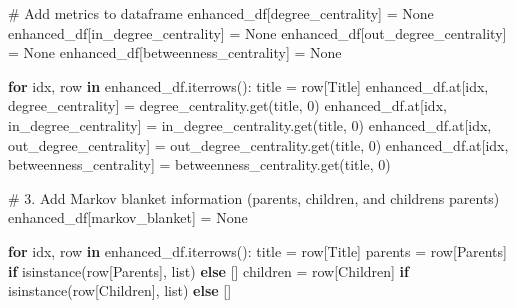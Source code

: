 \documentclass[
  11pt,
  letterpaper,
]{book}
\newenvironment{Shaded}{\begin{snugshade}}{\end{snugshade}}
\newcommand{\BuiltInTok}[1]{\textcolor[rgb]{0.00,0.23,0.31}{#1}}
\newcommand{\CommentTok}[1]{\textcolor[rgb]{0.37,0.37,0.37}{#1}}
\newcommand{\ControlFlowTok}[1]{\textcolor[rgb]{0.00,0.23,0.31}{\textbf{#1}}}
\newcommand{\DecValTok}[1]{\textcolor[rgb]{0.68,0.00,0.00}{#1}}
\newcommand{\KeywordTok}[1]{\textcolor[rgb]{0.00,0.23,0.31}{\textbf{#1}}}
\newcommand{\NormalTok}[1]{\textcolor[rgb]{0.00,0.23,0.31}{#1}}
\newcommand{\OperatorTok}[1]{\textcolor[rgb]{0.37,0.37,0.37}{#1}}
\newcommand{\StringTok}[1]{\textcolor[rgb]{0.13,0.47,0.30}{#1}}
\newcommand{\VariableTok}[1]{\textcolor[rgb]{0.07,0.07,0.07}{#1}}
\begin{document}
\begin{Shaded}
\begin{Highlighting}[]
    \CommentTok{\# Add metrics to dataframe}
\NormalTok{    enhanced\_df[}\StringTok{\textquotesingle{}degree\_centrality\textquotesingle{}}\NormalTok{] }\OperatorTok{=} \VariableTok{None}
\NormalTok{    enhanced\_df[}\StringTok{\textquotesingle{}in\_degree\_centrality\textquotesingle{}}\NormalTok{] }\OperatorTok{=} \VariableTok{None}
\NormalTok{    enhanced\_df[}\StringTok{\textquotesingle{}out\_degree\_centrality\textquotesingle{}}\NormalTok{] }\OperatorTok{=} \VariableTok{None}
\NormalTok{    enhanced\_df[}\StringTok{\textquotesingle{}betweenness\_centrality\textquotesingle{}}\NormalTok{] }\OperatorTok{=} \VariableTok{None}

    \ControlFlowTok{for}\NormalTok{ idx, row }\KeywordTok{in}\NormalTok{ enhanced\_df.iterrows():}
\NormalTok{        title }\OperatorTok{=}\NormalTok{ row[}\StringTok{\textquotesingle{}Title\textquotesingle{}}\NormalTok{]}
\NormalTok{        enhanced\_df.at[idx, }\StringTok{\textquotesingle{}degree\_centrality\textquotesingle{}}\NormalTok{] }\OperatorTok{=}\NormalTok{ degree\_centrality.get(title, }\DecValTok{0}\NormalTok{)}
\NormalTok{        enhanced\_df.at[idx, }\StringTok{\textquotesingle{}in\_degree\_centrality\textquotesingle{}}\NormalTok{] }\OperatorTok{=}\NormalTok{ in\_degree\_centrality.get(title, }\DecValTok{0}\NormalTok{)}
\NormalTok{        enhanced\_df.at[idx, }\StringTok{\textquotesingle{}out\_degree\_centrality\textquotesingle{}}\NormalTok{] }\OperatorTok{=}\NormalTok{ out\_degree\_centrality.get(title, }\DecValTok{0}\NormalTok{)}
\NormalTok{        enhanced\_df.at[idx, }\StringTok{\textquotesingle{}betweenness\_centrality\textquotesingle{}}\NormalTok{] }\OperatorTok{=}\NormalTok{ betweenness\_centrality.get(title, }\DecValTok{0}\NormalTok{)}

    \CommentTok{\# 3. Add Markov blanket information (parents, children, and children\textquotesingle{}s parents)}
\NormalTok{    enhanced\_df[}\StringTok{\textquotesingle{}markov\_blanket\textquotesingle{}}\NormalTok{] }\OperatorTok{=} \VariableTok{None}

    \ControlFlowTok{for}\NormalTok{ idx, row }\KeywordTok{in}\NormalTok{ enhanced\_df.iterrows():}
\NormalTok{        title }\OperatorTok{=}\NormalTok{ row[}\StringTok{\textquotesingle{}Title\textquotesingle{}}\NormalTok{]}
\NormalTok{        parents }\OperatorTok{=}\NormalTok{ row[}\StringTok{\textquotesingle{}Parents\textquotesingle{}}\NormalTok{] }\ControlFlowTok{if} \BuiltInTok{isinstance}\NormalTok{(row[}\StringTok{\textquotesingle{}Parents\textquotesingle{}}\NormalTok{], }\BuiltInTok{list}\NormalTok{) }\ControlFlowTok{else}\NormalTok{ []}
\NormalTok{        children }\OperatorTok{=}\NormalTok{ row[}\StringTok{\textquotesingle{}Children\textquotesingle{}}\NormalTok{] }\ControlFlowTok{if} \BuiltInTok{isinstance}\NormalTok{(row[}\StringTok{\textquotesingle{}Children\textquotesingle{}}\NormalTok{], }\BuiltInTok{list}\NormalTok{) }\ControlFlowTok{else}\NormalTok{ []}


\end{Highlighting}
\end{Shaded}
\end{document}

